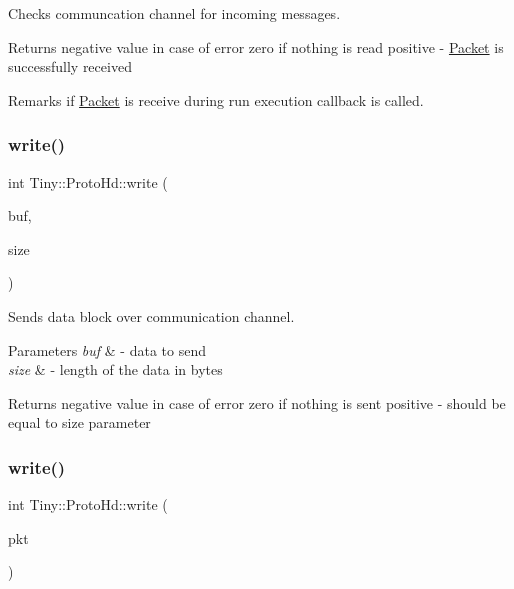 Checks communcation channel for incoming messages. \begin{DoxyReturn}{Returns}
negative value in case of error zero if nothing is read positive -\/ \hyperlink{classTiny_1_1Packet}{Packet} is successfully received 
\end{DoxyReturn}
\begin{DoxyRemark}{Remarks}
if \hyperlink{classTiny_1_1Packet}{Packet} is receive during run execution callback is called. 
\end{DoxyRemark}
\mbox{\label{classTiny_1_1ProtoHd_af53c8817317d3a62535e68ca236a038f}} 
\subsubsection{\texorpdfstring{write()}{write()}\hspace{0.1cm}{\footnotesize\ttfamily [1/2]}}
{\footnotesize\ttfamily int Tiny\+::\+Proto\+Hd\+::write (\begin{DoxyParamCaption}\item[{char $\ast$}]{buf,  }\item[{int}]{size }\end{DoxyParamCaption})}

Sends data block over communication channel. 
\begin{DoxyParams}{Parameters}
{\em buf} & -\/ data to send \\
\hline
{\em size} & -\/ length of the data in bytes \\
\hline
\end{DoxyParams}
\begin{DoxyReturn}{Returns}
negative value in case of error zero if nothing is sent positive -\/ should be equal to size parameter 
\end{DoxyReturn}
\mbox{\label{classTiny_1_1ProtoHd_a1f4e0864f08191bfc66dce68b339250f}} 
\subsubsection{\texorpdfstring{write()}{write()}\hspace{0.1cm}{\footnotesize\ttfamily [2/2]}}
{\footnotesize\ttfamily int Tiny\+::\+Proto\+Hd\+::write (\begin{DoxyParamCaption}\item[{\hyperlink{classTiny_1_1IPacket}{I\+Packet} \&}]{pkt }\end{DoxyParamCaption})}

